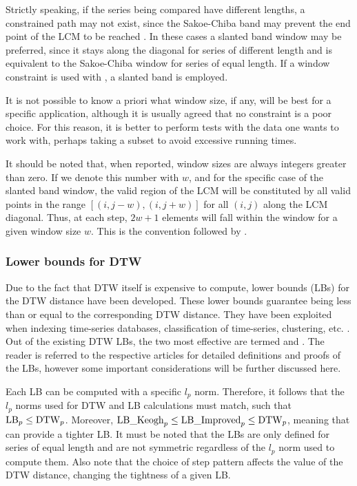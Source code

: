 Strictly speaking,
if the series being compared have different lengths,
a constrained path may not exist,
since the Sakoe-Chiba band may prevent the end point of the LCM to be reached \citep{giorgino2009}.
In these cases a slanted band window may be preferred,
since it stays along the diagonal for series of different length and is equivalent to the Sakoe-Chiba window for series of equal length.
If a window constraint is used with \dtwclust{},
a slanted band is employed.

It is not possible to know a priori what window size, if any, will be best for a specific application,
although it is usually agreed that no constraint is a poor choice.
For this reason, it is better to perform tests with the data one wants to work with,
perhaps taking a subset to avoid excessive running times.

It should be noted that, when reported, window sizes are always integers greater than zero.
If we denote this number with $w$,
and for the specific case of the slanted band window,
the valid region of the LCM will be constituted by all valid points in the range
$\left[ (i,j - w), (i, j + w) \right]$
for all $(i,j)$ along the LCM diagonal.
Thus, at each step, $2w + 1$ elements will fall within the window for a given window size $w$.
This is the convention followed by \dtwclust{}.

\subsubsection{Lower bounds for DTW}
\label{sec:lbs}

Due to the fact that DTW itself is expensive to compute,
lower bounds (LBs) for the DTW distance have been developed.
These lower bounds guarantee being less than or equal to the corresponding DTW distance.
They have been exploited when indexing time-series databases,
classification of time-series,
clustering,
etc. \citep{keogh2005, begum2015}.
Out of the existing DTW LBs,
the two most effective are termed  \citep{keogh2005} and  \citep{lemire2009}.
The reader is referred to the respective articles for detailed definitions and proofs of the LBs,
however some important considerations will be further discussed here.

Each LB can be computed with a specific $l_p$ norm.
Therefore, it follows that the $l_p$ norms used for DTW and LB calculations must match,
such that $\text{LB}_p \leq \text{DTW}_p{}$.
Moreover, $\text{LB\_Keogh}_p \leq \text{LB\_Improved}_p \leq \text{DTW}_p{}$,
meaning that  can provide a tighter LB.
It must be noted that the LBs are only defined for series of equal length and are not symmetric regardless of the $l_p$ norm used to compute them.
Also note that the choice of step pattern affects the value of the DTW distance,
changing the tightness of a given LB.

